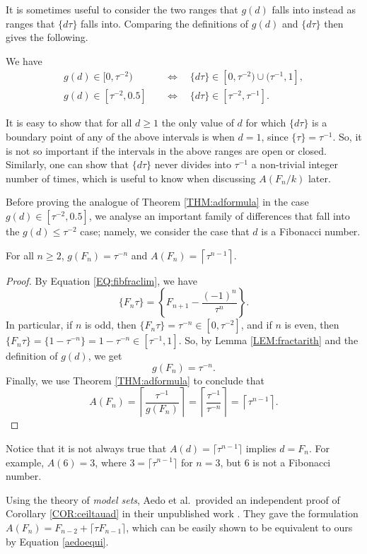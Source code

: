 \documentclass[10pt,a4paper,reqno]{amsart}
\begin{document}
It is sometimes useful to consider the two ranges that $g(d)$ falls into instead as ranges that $\{d\tau\}$ falls into. Comparing the definitions of $g(d)$ and $\{d\tau\}$ then gives the following.
\begin{lem}\label{LEM:fractarith}
We have
\begin{align*}
g(d) \in [0, \tau^{-2}) &\quad \Longleftrightarrow \quad  \{ d\tau\} \in[0,\tau^{-2})\cup (\tau^{-1},1],\\
g(d) \in [\tau^{-2},0.5] &\quad \Longleftrightarrow \quad  \{ d\tau \} \in [\tau^{-2},\tau^{-1}].
\end{align*}
\end{lem}
\begin{rem}\label{REM:I0gdnodiv}
It is easy to show that for all $d\geq 1$ the only value of $d$ for which $\{d\tau\}$ is a boundary point of any of the above intervals is when $d=1$, since $\{\tau\} = \tau^{-1}$. So, it is not so important if the intervals in the above ranges are open or closed. Similarly, one can show that $\{d\tau\}$ never divides into $\tau^{-1}$ a non-trivial integer number of times, which is useful to know when discussing $A(F_n/k)$ later.
\end{rem}
Before proving the analogue of Theorem \ref{THM:adformula} in the case $g(d) \in [\tau^{-2},0.5]$, we analyse an important family of differences that fall into the $g(d) \leq \tau^{-2}$ case; namely, we consider the case that $d$ is a Fibonacci number.
\begin{cor}\label{COR:ceiltauad}
    For all $n\geq2$, $g(F_n)=\tau^{-n}$ and $A(F_n)=\left\lceil\tau^{n-1}\right\rceil$.
\end{cor}
\begin{proof}
By Equation \ref{EQ:fibfraclim}, we have
\[
\{ F_n \tau\}=\left\{ F_{n+1}-\frac{(-1)^{n}}{\tau^{n}}\right\}.
\]
In particular, if $n$ is odd, then $ \{ F_{n}\tau\}=\tau^{-n}\in[0,\tau^{-2}]$, and if $n$ is even, then $\{ F_{n}\tau \}= \{ 1-\tau^{-n}\}=1-\tau^{-n}\in[\tau^{-1},1]$. So, by Lemma \ref{LEM:fractarith} and the definition of $g(d)$, we get 
\[
g(F_n)=\tau^{-n}.
\]
Finally, we use Theorem \ref{THM:adformula} to conclude that
\[
A(F_n)=\left\lceil\frac{\tau^{-1}}{g(F_n)}\right\rceil=\left\lceil\frac{\tau^{-1}}{\tau^{-n}}\right\rceil=\left\lceil\tau^{n-1}\right\rceil.
\]
\end{proof}
\begin{rem}
Notice that it is not always true that $A(d)=\lceil\tau^{n-1}\rceil$ implies $d=F_n$. For example, $A(6)=3$, where $3=\lceil\tau^{n-1}\rceil$ for $n=3$, but $6$ is not a Fibonacci number.
\end{rem}
\begin{rem}
    Using the theory of {\em model sets}, Aedo et al.\ provided an independent proof of Corollary \ref{COR:ceiltauad} in their unpublished work \cite{aedonote2022}. They gave the formulation $A(F_n)=F_{n-2}+\lceil\tau F_{n-1}\rceil$, which can be easily shown to be equivalent to ours by Equation \ref{aedoequi}.
\end{rem}
\end{document}
